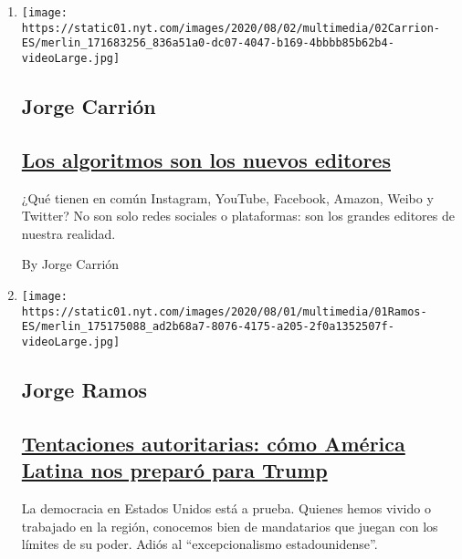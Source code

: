 \begin{enumerate}
\def\labelenumi{\arabic{enumi}.}
\item
  \texttt{[image: https://static01.nyt.com/images/2020/08/02/multimedia/02Carrion-ES/merlin\_171683256\_836a51a0-dc07-4047-b169-4bbbb85b62b4-videoLarge.jpg]}

  \hypertarget{jorge-carriuxf3n}{%
  \subsection{Jorge Carrión}\label{jorge-carriuxf3n}}

  \hypertarget{los-algoritmos-son-los-nuevos-editores}{%
  \subsection{\texorpdfstring{\href{/es/2020/08/02/espanol/opinion/facebook-amazon-instagram.html}{Los
  algoritmos son los nuevos
  editores}}{Los algoritmos son los nuevos editores}}\label{los-algoritmos-son-los-nuevos-editores}}

  ¿Qué tienen en común Instagram, YouTube, Facebook, Amazon, Weibo y
  Twitter? No son solo redes sociales o plataformas: son los grandes
  editores de nuestra realidad.

  By Jorge Carrión
\item
  \texttt{[image: https://static01.nyt.com/images/2020/08/01/multimedia/01Ramos-ES/merlin\_175175088\_ad2b68a7-8076-4175-a205-2f0a1352507f-videoLarge.jpg]}

  \hypertarget{jorge-ramos}{%
  \subsection{Jorge Ramos}\label{jorge-ramos}}

  \hypertarget{tentaciones-autoritarias-cuxf3mo-amuxe9rica-latina-nos-preparuxf3-para-trump}{%
  \subsection{\texorpdfstring{\href{/es/2020/08/01/espanol/opinion/trump-autoritarismo.html}{Tentaciones
  autoritarias: cómo América Latina nos preparó para
  Trump}}{Tentaciones autoritarias: cómo América Latina nos preparó para Trump}}\label{tentaciones-autoritarias-cuxf3mo-amuxe9rica-latina-nos-preparuxf3-para-trump}}

  La democracia en Estados Unidos está a prueba. Quienes hemos vivido o
  trabajado en la región, conocemos bien de mandatarios que juegan con
  los límites de su poder. Adiós al ``excepcionalismo estadounidense''.


\end{enumerate}

